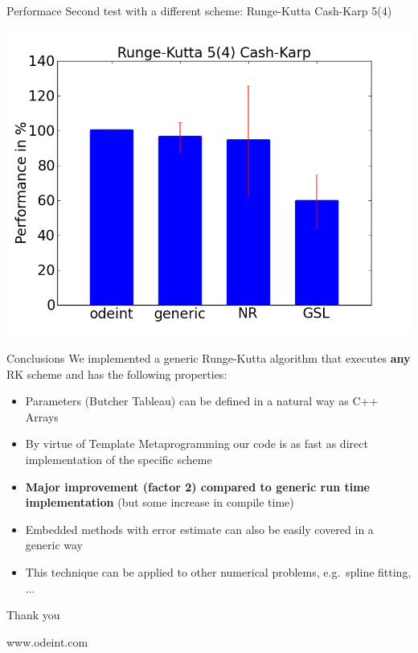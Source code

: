 \documentclass{beamer}
\begin{document}
\begin{frame}{Performace}
 Second test with a different scheme: Runge-Kutta Cash-Karp 5(4)
 \begin{center} \includegraphics[width=0.8\linewidth]{perf_rk54ck.png} \end{center}
\end{frame}


\begin{frame}{Conclusions}
We implemented a generic Runge-Kutta algorithm that executes \textbf{any} RK scheme and has the following properties:
\begin{itemize}
 \item Parameters (Butcher Tableau) can be defined in a natural way as C++ Arrays
 \item By virtue of Template Metaprogramming our code is as fast as direct implementation of the specific scheme
 \item \textbf{Major improvement (factor 2) compared to generic run time implementation} (but some increase in compile time)
 \item Embedded methods with error estimate can also be easily covered in a generic way
 \item This technique can be applied to other numerical problems, e.g.\ spline fitting, ...
\end{itemize}

\pause
\vspace{1em}
\begin{center}
 \begin{huge}Thank you\end{huge}
\end{center}

\end{frame}


\begin{frame}
 

\begin{center}
\huge
 www.odeint.com
\end{center}

\end{frame}
\end{document}
